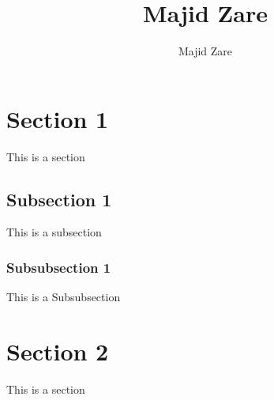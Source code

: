 \documentclass[]{article}
\title{Majid Zare}
\author{Majid Zare}
\date{}
\begin{document}
\maketitle

\section{Section 1}
This is a section

\subsection{Subsection 1}
This is a subsection

\subsubsection{Subsubsection 1}
This is a Subsubsection

\section{Section 2}
This is a section
\end{document}
